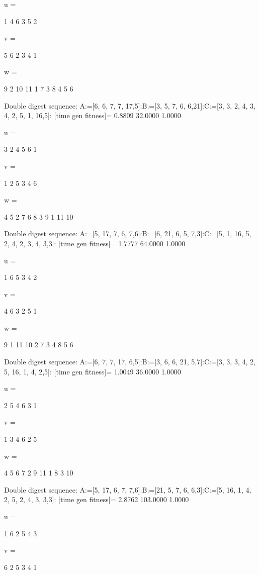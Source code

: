 u =

     1     4     6     3     5     2


v =

     5     6     2     3     4     1


w =

     9     2    10    11     1     7     3     8     4     5     6

Double digest sequence:
A:=[6, 6, 7, 7, 17,5]:B:=[3, 5, 7, 6, 6,21]:C:=[3, 3, 2, 4, 3, 4, 2, 5, 1, 16,5]:
[time gen fitness]=
    0.8809   32.0000    1.0000


u =

     3     2     4     5     6     1


v =

     1     2     5     3     4     6


w =

     4     5     2     7     6     8     3     9     1    11    10

Double digest sequence:
A:=[5, 17, 7, 6, 7,6]:B:=[6, 21, 6, 5, 7,3]:C:=[5, 1, 16, 5, 2, 4, 2, 3, 4, 3,3]:
[time gen fitness]=
    1.7777   64.0000    1.0000


u =

     1     6     5     3     4     2


v =

     4     6     3     2     5     1


w =

     9     1    11    10     2     7     3     4     8     5     6

Double digest sequence:
A:=[6, 7, 7, 17, 6,5]:B:=[3, 6, 6, 21, 5,7]:C:=[3, 3, 3, 4, 2, 5, 16, 1, 4, 2,5]:
[time gen fitness]=
    1.0049   36.0000    1.0000


u =

     2     5     4     6     3     1


v =

     1     3     4     6     2     5


w =

     4     5     6     7     2     9    11     1     8     3    10

Double digest sequence:
A:=[5, 17, 6, 7, 7,6]:B:=[21, 5, 7, 6, 6,3]:C:=[5, 16, 1, 4, 2, 5, 2, 4, 3, 3,3]:
[time gen fitness]=
    2.8762  103.0000    1.0000


u =

     1     6     2     5     4     3


v =

     6     2     5     3     4     1


